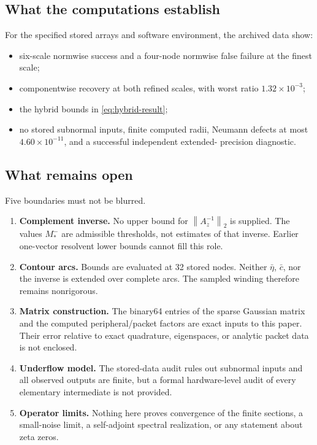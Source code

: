 \documentclass[11pt]{article}
\theoremstyle{definition}
\theoremstyle{remark}
\newcommand{\norm}[1]{\left\lVert#1\right\rVert}
\begin{document}
\subsection{What the computations establish}

For the specified stored arrays and software environment, the archived data
show:

\begin{itemize}
 \item six-scale normwise success and a four-node normwise false failure at
 the finest scale;
 \item componentwise recovery at both refined scales, with worst ratio
 \(1.32\times10^{-3}\);
 \item the hybrid bounds in \cref{eq:hybrid-result};
 \item no stored subnormal inputs, finite computed radii, Neumann defects at
 most \(4.60\times10^{-11}\), and a successful independent extended-
 precision diagnostic.
\end{itemize}

\subsection{What remains open}

Five boundaries must not be blurred.

\begin{enumerate}
 \item \textbf{Complement inverse.}  No upper bound for
 \(\norm{A_z^{-1}}_2\) is supplied.  The values \(M_*^-\) are admissible
 thresholds, not estimates of that inverse.  Earlier one-vector resolvent
 lower bounds cannot fill this role.
 \item \textbf{Contour arcs.}  Bounds are evaluated at 32 stored nodes.
 Neither \(\bar\eta\), \(\bar c\), nor the inverse is extended over complete
 arcs.  The sampled winding therefore remains nonrigorous.
 \item \textbf{Matrix construction.}  The binary64 entries of the sparse
 Gaussian matrix and the computed peripheral/packet factors are exact
 inputs to this paper.  Their error relative to exact quadrature,
 eigenspaces, or analytic packet data is not enclosed.
 \item \textbf{Underflow model.}  The stored-data audit rules out subnormal
 inputs and all observed outputs are finite, but a formal hardware-level
 audit of every elementary intermediate is not provided.
 \item \textbf{Operator limits.}  Nothing here proves convergence of the
 finite sections, a small-noise limit, a self-adjoint spectral realization,
 or any statement about zeta zeros.
\end{enumerate}
\end{document}
